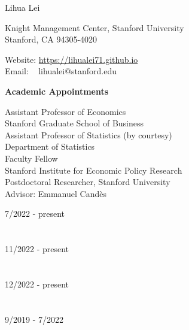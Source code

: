 \documentclass{article}
\begin{document}
\begin{Huge}
\noindent Lihua Lei
\end{Huge}

\vspace{5mm}
\begin{minipage}{0.6\linewidth}
  \flushleft
\noindent Knight Management Center, Stanford University \\
\noindent Stanford, CA 94305-4020
\end{minipage}
\hfill
\begin{minipage}{0.4\linewidth}
  Website: \url{https://lihualei71.github.io}\\
  Email: \,\,\,\,\,lihualei@stanford.edu
\end{minipage}

\vspace{5mm}
\begin{large}
\noindent \textbf{Academic Appointments}
\end{large}
\vspace{5mm}

\begin{minipage}{0.65\linewidth}
  \noindent Assistant Professor of Economics \\
  Stanford Graduate School of Business\\

  \noindent Assistant Professor of Statistics (by courtesy) \\
  Department of Statistics\\

  \noindent Faculty Fellow \\
  Stanford Institute for Economic Policy Research \\

  \noindent Postdoctoral Researcher, Stanford University\\
  Advisor: Emmanuel Cand\`{e}s
\end{minipage}\hfill
\begin{minipage}{0.34\linewidth}
\flushright
\vspace{-3mm}
7/2022 - present\\
~\\
~\\
11/2022 - present\\
~\\
~\\
12/2022 - present\\
~\\
~\\
9/2019 - 7/2022 \\
\end{minipage}
\end{document}
